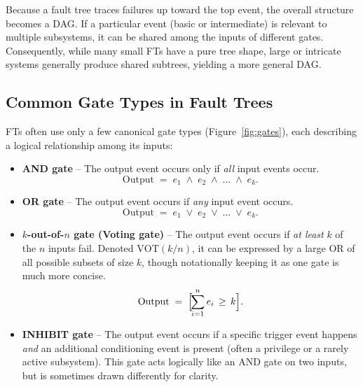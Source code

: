 Because a fault tree traces failures up toward the top event, the overall structure becomes a DAG. If a particular event (basic or intermediate) is relevant to multiple subsystems, it can be shared among the inputs of different gates. Consequently, while many small FTs have a pure tree shape, large or intricate systems generally produce shared subtrees, yielding a more general DAG.

\subsection{Common Gate Types in Fault Trees}

FTs often use only a few canonical gate types (Figure~\ref{fig:gates}), each describing a logical relationship among its inputs:

\begin{itemize}
\item \textbf{AND gate} – The output event occurs only if \emph{all} input events occur.  
\[
  \text{Output} \;=\; e_1 \;\land\; e_2 \;\land\;\dots\;\land\; e_k.
\]
\item \textbf{OR gate} – The output event occurs if \emph{any} input event occurs.  
\[
  \text{Output} \;=\; e_1 \;\lor\; e_2 \;\lor\;\dots\;\lor\; e_k.
\]
\item \textbf{\(k\)-out-of-\(n\) gate (Voting gate)} – The output event occurs if \emph{at least} \(k\) of the \(n\) inputs fail. Denoted \(\mathrm{VOT}(k/n)\), it can be expressed by a large OR of all possible subsets of size \(k\), though notationally keeping it as one gate is much more concise.  
\[
  \text{Output} \;=\;
  \Bigl[\!\sum_{i=1}^n e_i \,\ge\, k\Bigr].
\]
\item \textbf{INHIBIT gate} – The output event occurs if a specific trigger event happens \emph{and} an additional conditioning event is present (often a privilege or a rarely active subsystem). This gate acts logically like an AND gate on two inputs, but is sometimes drawn differently for clarity.
\end{itemize}

